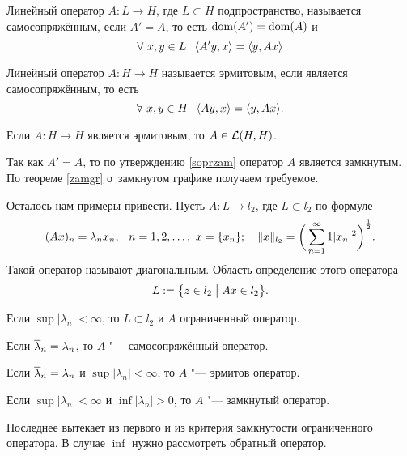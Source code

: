 \begin{Def}
  Линейный оператор $A\colon L\to H$, где $L\subset H$ подпространство, называется самосопряжённым, если $A'=A$, то есть $\operatorname{dom}(A') = \operatorname{dom}(A)$ и 
\[
  \forall\ x,y\in L\pau   \la A'y,x\ra = \la y,Ax\ra
\]
\end{Def}
\begin{Def}
  Линейный оператор $A\colon H\to H$ называется эрмитовым, если является самосопряжённым, то есть 
\[
  \forall\ x,y\in H\pau \la Ay,x\ra = \la y,Ax\ra.
\]
\end{Def}
\begin{The}
  Если $A\colon H\to H$ является эрмитовым, то $A\in \mathcal L(H,H)$.
\end{The}
\begin{Proof}
  Так как $A'=A$, то по утверждению \ref{soprzam} оператор $A$ является замкнутым. По теореме \ref{zamgr} о~замкнутом графике получаем требуемое.
\end{Proof}

Осталось нам примеры привести. Пусть $A\colon L\to l_2$, где $L\subset l_2$ по формуле
\[
  (Ax)_n = \lambda_nx_n,\hskip .75em plus.1em minus.08em\relax n=1,2,\dots,\ x = \{x_n\};\quad \|x\|_{l_2} = \bigg(\sum\limits_{{n}={1}}^\infty1|x_n|^2\bigg)^{\frac{1}{2}}.
\]
Такой оператор называют диагональным. Область определение этого оператора
\[
  L:=\big\{ z\in l_2\bigm| Ax\in l_2 \big\}.
\]
\begin{Exa}
  Если $\sup |\lambda_n|<\infty$, то $L\subset l_2$ и $A$ ограниченный оператор.
\end{Exa}
\begin{Exa}
  Если $\overline{\lambda}_n = \lambda_n$, то $A$ "--- самосопряжённый оператор.
\end{Exa}
\begin{Exa}
  Если $\overline{\lambda}_n = \lambda_n$ и $\sup|\lambda_n|<\infty$, то $A$ "--- эрмитов оператор.
\end{Exa}
\begin{Exa}
  Если $\sup|\lambda_n|<\infty$ и $\inf|\lambda_n|>0$, то $A$ "--- замкнутый оператор.
\end{Exa}
Последнее вытекает из первого и из критерия замкнутости ограниченного оператора. В случае $\inf$ нужно рассмотреть обратный оператор.
